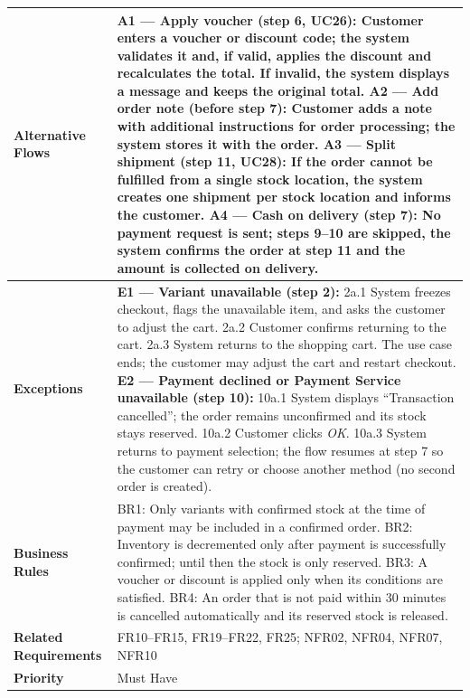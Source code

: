 \documentclass[11pt,a4paper,oneside]{extreport}
\newcommand{\ucrow}[2]{\textbf{#1} & #2 \\ \midrule}
\begin{document}
{\begin{xltabular}{\textwidth}{@{}L{3.1cm} Y@{}}
\ucrow{Alternative Flows}{%
\textbf{A1 --- Apply voucher (step 6, UC26):} Customer enters a voucher or discount code; the system validates it and, if valid, applies the discount and recalculates the total. If invalid, the system displays a message and keeps the original total.\newline
\textbf{A2 --- Add order note (before step 7):} Customer adds a note with additional instructions for order processing; the system stores it with the order.\newline
\textbf{A3 --- Split shipment (step 11, UC28):} If the order cannot be fulfilled from a single stock location, the system creates one shipment per stock location and informs the customer.\newline
\textbf{A4 --- Cash on delivery (step 7):} No payment request is sent; steps 9--10 are skipped, the system confirms the order at step 11 and the amount is collected on delivery.}
\ucrow{Exceptions}{%
\textbf{E1 --- Variant unavailable (step 2):}\newline
2a.1 System freezes checkout, flags the unavailable item, and asks the customer to adjust the cart.\newline
2a.2 Customer confirms returning to the cart.\newline
2a.3 System returns to the shopping cart. The use case ends; the customer may adjust the cart and restart checkout.\newline
\textbf{E2 --- Payment declined or Payment Service unavailable (step 10):}\newline
10a.1 System displays ``Transaction cancelled''; the order remains unconfirmed and its stock stays reserved.\newline
10a.2 Customer clicks \emph{OK}.\newline
10a.3 System returns to payment selection; the flow resumes at step 7 so the customer can retry or choose another method (no second order is created).}
\ucrow{Business Rules}{%
BR1: Only variants with confirmed stock at the time of payment may be included in a confirmed order.\newline
BR2: Inventory is decremented only after payment is successfully confirmed; until then the stock is only reserved.\newline
BR3: A voucher or discount is applied only when its conditions are satisfied.\newline
BR4: An order that is not paid within 30 minutes is cancelled automatically and its reserved stock is released.}
\ucrow{Related Requirements}{FR10--FR15, FR19--FR22, FR25; NFR02, NFR04, NFR07, NFR10}
\textbf{Priority} & Must Have \\
\end{xltabular}
}
\end{document}
